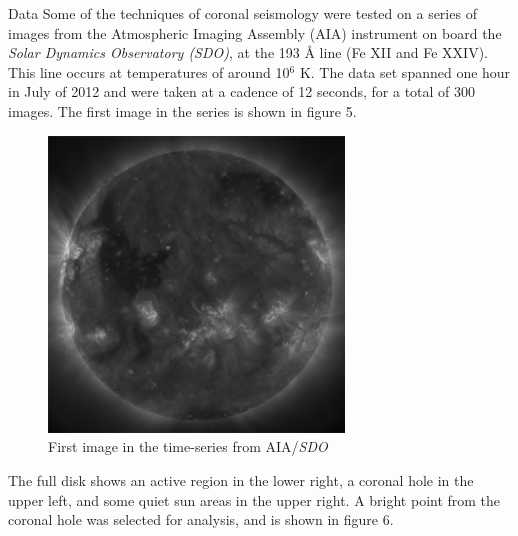 \documentclass[t]{beamer}
\begin{document}
\begin{frame}[t]
\begin{block}{}
\begin{columns}
        \begin{block}{Data}
            Some of the techniques of coronal seismology were tested on a
            series of images from the
            Atmospheric Imaging Assembly (AIA) instrument
            on board the \emph{Solar Dynamics Observatory (SDO)},
            at the 193 \AA{} line (Fe XII and Fe XXIV). This line occurs at
            temperatures of around 10$^{6}$ K.
            The data set spanned one hour in July of 2012 and were taken
            at a cadence of 12 seconds, for a total of 300 images.
            The first image in the series is shown in
            \textcolor{mygreen}{figure 5}.
            \par\vspace{10pt}
            \begin{figure}
                \includegraphics[width=0.7\textwidth]{full_disk.png}
                \caption{First image in the time-series from
                    AIA/\emph{SDO}
            }
            \end{figure}
            The full disk shows an active region in the lower right, a coronal hole
            in the upper left, and some quiet sun areas in the upper right.
            A bright point from the coronal hole was selected for analysis,
            and is shown in \textcolor{mygreen}{figure 6}.
            \par\vspace{20pt}
            \begin{figure}

\end{figure}
\end{block}
\end{columns}
\end{block}
\end{frame}
\end{document}
